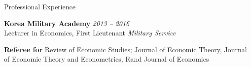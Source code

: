 
\begin{rSection}{Professional Experience}

{\bf Korea Military Academy} \hfill {\em 2013 -- 2016} \\[5pt] 
Lecturer in Economics, First Lieutenant \hfill {\em Military Service}

\medskip 

{\bf Referee for } Review of Economic Studies; Journal of Economic Theory, Journal of Economic Theory and Econometrics, Rand Journal of Economics

\end{rSection}